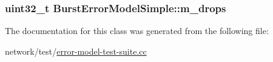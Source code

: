 \subsubsection[{\texorpdfstring{m\+\_\+drops}{m_drops}}]{\setlength{\rightskip}{0pt plus 5cm}uint32\+\_\+t Burst\+Error\+Model\+Simple\+::m\+\_\+drops\hspace{0.3cm}{\ttfamily [private]}}\hypertarget{classBurstErrorModelSimple_a90cc4d2cfc518b4d9b3041f772a307eb}{}\label{classBurstErrorModelSimple_a90cc4d2cfc518b4d9b3041f772a307eb}


The documentation for this class was generated from the following file\+:\begin{DoxyCompactItemize}
\item 
network/test/\hyperlink{error-model-test-suite_8cc}{error-\/model-\/test-\/suite.\+cc}\end{DoxyCompactItemize}
